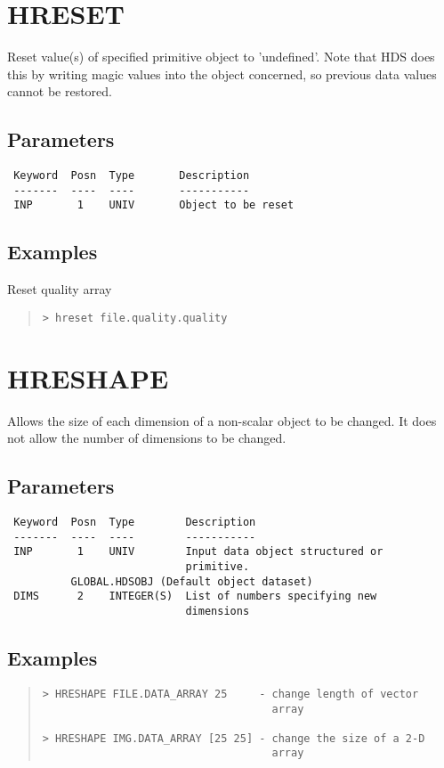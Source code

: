 \documentclass{book}
\renewcommand{\_}{{\tt\char'137}}     %
\begin{document}
\section{HRESET}
Reset value(s) of specified primitive object to 'undefined'.
Note that HDS does this by writing magic values into the object
concerned, so previous data values cannot be restored.

\subsection{Parameters}
\begin{verbatim}
 Keyword  Posn  Type       Description
 -------  ----  ----       -----------
 INP       1    UNIV       Object to be reset

\end{verbatim}\subsection{Examples}
Reset quality array
\begin{quote}\begin{verbatim}
> hreset file.quality.quality
\end{verbatim}\end{quote}
\section{HRESHAPE}
Allows the size of each dimension of a non-scalar object to be
changed. It does not allow the number of dimensions to be
changed.

\subsection{Parameters}
\begin{verbatim}
 Keyword  Posn  Type        Description
 -------  ----  ----        -----------
 INP       1    UNIV        Input data object structured or
                            primitive.
          GLOBAL.HDSOBJ (Default object dataset)
 DIMS      2    INTEGER(S)  List of numbers specifying new
                            dimensions

\end{verbatim}\subsection{Examples}
\begin{quote}\begin{verbatim}
> HRESHAPE FILE.DATA_ARRAY 25     - change length of vector
                                    array

> HRESHAPE IMG.DATA_ARRAY [25 25] - change the size of a 2-D
                                    array
\end{verbatim}\end{quote}
\end{document}
